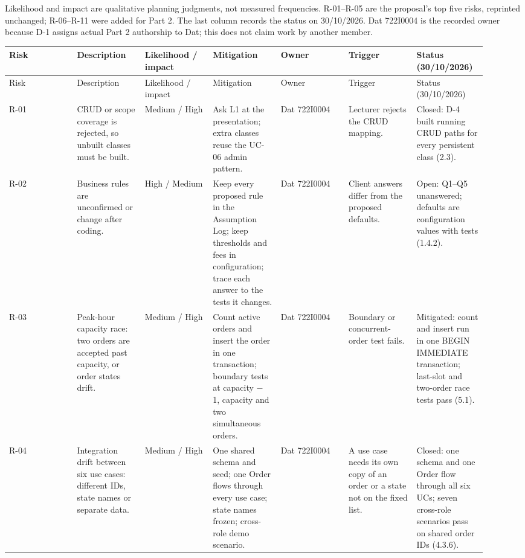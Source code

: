 Likelihood and impact are qualitative planning judgments, not measured frequencies. R-01--R-05 are the proposal's top five risks, reprinted unchanged; R-06--R-11 were added for Part 2. The last column records the status on 30/10/2026. Dat 722I0004 is the recorded owner because D-1 assigns actual Part 2 authorship to Dat; this does not claim work by another member.

\begin{landscape}
\begingroup\footnotesize
\begin{longtable}{>{\raggedright\arraybackslash}p{0.1314\linewidth}>{\raggedright\arraybackslash}p{0.1314\linewidth}>{\raggedright\arraybackslash}p{0.1314\linewidth}>{\raggedright\arraybackslash}p{0.1314\linewidth}>{\raggedright\arraybackslash}p{0.1314\linewidth}>{\raggedright\arraybackslash}p{0.1314\linewidth}>{\raggedright\arraybackslash}p{0.1314\linewidth}}
Risk & Description & Likelihood / impact & Mitigation & Owner & Trigger & Status (30/10/2026) \\
\hline\endfirsthead
Risk & Description & Likelihood / impact & Mitigation & Owner & Trigger & Status (30/10/2026) \\
\hline\endhead
R-01 & CRUD or scope coverage is rejected, so unbuilt classes must be built. & Medium / High & Ask L1 at the presentation; extra classes reuse the UC-06 admin pattern. & Dat 722I0004 & Lecturer rejects the CRUD mapping. & Closed: D-4 built running CRUD paths for every persistent class (2.3). \\
R-02 & Business rules are unconfirmed or change after coding. & High / Medium & Keep every proposed rule in the Assumption Log; keep thresholds and fees in configuration; trace each answer to the tests it changes. & Dat 722I0004 & Client answers differ from the proposed defaults. & Open: Q1--Q5 unanswered; defaults are configuration values with tests (1.4.2). \\
R-03 & Peak-hour capacity race: two orders are accepted past capacity, or order states drift. & Medium / High & Count active orders and insert the order in one transaction; boundary tests at capacity \ensuremath{-} 1, capacity and two simultaneous orders. & Dat 722I0004 & Boundary or concurrent-order test fails. & Mitigated: count and insert run in one BEGIN IMMEDIATE transaction; last-slot and two-order race tests pass (5.1). \\
R-04 & Integration drift between six use cases: different IDs, state names or separate data. & Medium / High & One shared schema and seed; one Order flows through every use case; state names frozen; cross-role demo scenario. & Dat 722I0004 & A use case needs its own copy of an order or a state not on the fixed list. & Closed: one schema and one Order flow through all six UCs; seven cross-role scenarios pass on shared order IDs (4.3.6). \\

\end{longtable}
\end{landscape}
